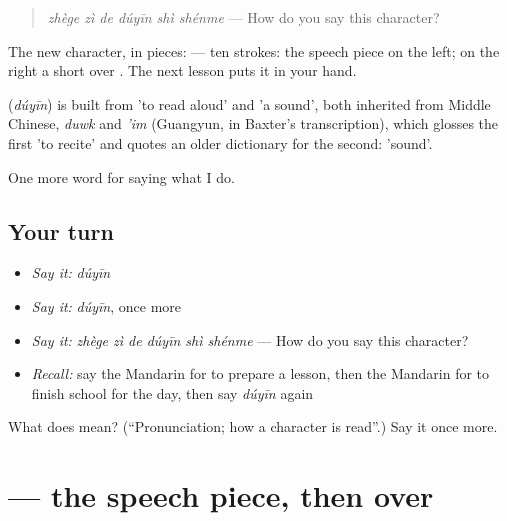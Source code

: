 \begin{quote}
\textbf{} \emph{zhège zì de dúyīn shì shénme} — How do you say this character?
\end{quote}

The new character, in pieces:  — ten strokes: the speech piece  on the left; on the right a short  over . The next lesson puts it in your hand.

\begin{cousinweb}
\textbf{} (\emph{dúyīn}) is built from  'to read aloud' and  'a sound', both inherited from Middle Chinese, \emph{duwk} and \emph{'im} (Guangyun, in Baxter's transcription), which glosses the first 'to recite' and quotes an older dictionary for the second: 'sound'.
\end{cousinweb}

\begin{grammarlens}[title={What you've built}]
One more word for saying what I do.
\end{grammarlens}

\subsection*{Your turn}
\begin{itemize}
\raggedright
  \item \emph{Say it:} \emph{dúyīn}
  \item \emph{Say it:} \emph{dúyīn}, once more
  \item \emph{Say it:} \emph{zhège zì de dúyīn shì shénme} — How do you say this character?
  \item \emph{Recall:} say the Mandarin for to prepare a lesson, then the Mandarin for to finish school for the day, then say \emph{dúyīn} again
\end{itemize}

\begin{tcolorbox}[breakable,colback=teal!4,colframe=teal!35!black,title={Before you move on}]
What does  mean? (\textquotedblleft{}Pronunciation; how a character is read\textquotedblright{}.) Say it once more.
\end{tcolorbox}
\section[\texorpdfstring{\zh{读} (dú)}{读 (dú)}]{ — the speech piece, then  over }

\label{lesson:ZH-W249-du-read}



